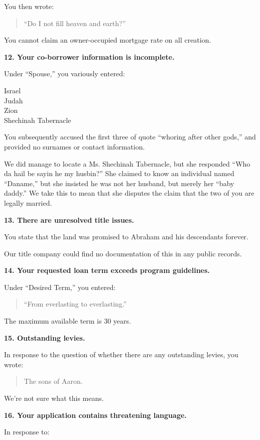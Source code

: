 {{You then wrote:

\begin{quote}
``Do I not fill heaven and earth?''
\end{quote}

You cannot claim an owner-occupied mortgage rate on all creation.

\textbf{12. Your co-borrower information is incomplete.}

Under ``Spouse,'' you variously entered:

Israel\\Judah\\Zion\\Shechinah Tabernacle

You subsequently accused the first three of quote ``whoring after other gods,'' and provided no surnames or contact information.

We did manage to locate a Ms. Shechinah Tabernacle, but she responded ``Who da hail be sayin he my husbin?'' She claimed to know an individual named ``Daname,'' but she insisted he was not her husband, but merely her ``baby daddy.'' We take this to mean that she disputes the claim that the two of you are legally married.

\textbf{13. There are unresolved title issues.}

You state that the land was promised to Abraham and his descendants forever.

Our title company could find no documentation of this in any public records.

\textbf{14. Your requested loan term exceeds program guidelines.}

Under ``Desired Term,'' you entered:

\begin{quote}
``From everlasting to everlasting.''
\end{quote}

The maximum available term is 30 years.

\textbf{15. Outstanding levies.}

In response to the question of whether there are any outstanding levies, you wrote:

\begin{quote}
The sons of Aaron.
\end{quote}

We're not sure what this means.

\textbf{16. Your application contains threatening language.}

In response to:

}}
